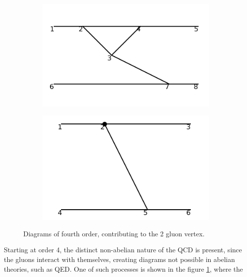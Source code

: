 \documentclass[11pt,a4paper,twoside,pdf]{article}
\numberwithin{equation}{section}
\begin{document}
\begin{figure}[h!]
    \centering
    \begin{subfigure}[t]{0.33\textwidth}
        \centering
        \includegraphics[width=\textwidth]{plots/order4/1.png}
        \caption{ }
    \end{subfigure}%
    \begin{subfigure}[t]{0.33\textwidth}
        \centering
        \includegraphics[width=\textwidth]{plots/order4/counterterms/1.png}
        \caption{ }
    \end{subfigure}
    \caption{Diagrams of fourth order, contributing to the 2 gluon vertex.}
    \label{fig:order4/1}
\end{figure}

Starting at order 4, the distinct non-abelian nature of the QCD is present, since 
the gluons interact with themselves, creating diagrams not possible in abelian theories, 
such as QED. One of such processes is shown in the figure \ref{fig:order4/1}, where the
\end{document}
